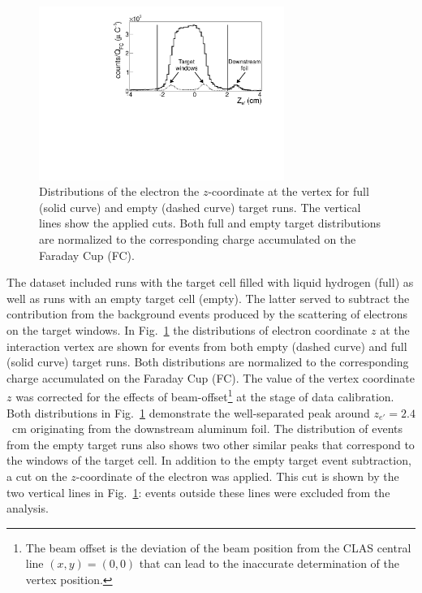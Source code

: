 \documentclass[prc,twocolumn,superscriptaddress,showpacs,amssymb,amsmath,amsfonts,aps,nofootinbib]{revtex4-1}
\begin{document}
\begin{figure}[htp]
\begin{center}
 \includegraphics[width=8cm,keepaspectratio,clip,trim={0 0 0 0}]{pictures/vertex/vertex_new.pdf}
\vspace{-0.1cm}
\caption{Distributions of the electron the $z$-coordinate at the vertex for full (solid curve) and empty (dashed curve) target runs. The vertical lines show the applied cuts. Both full and empty target distributions are normalized to the corresponding charge accumulated on the Faraday Cup (FC).}
\label{fig:zvertex}
\end{center}
\end{figure} 

The dataset included runs with the target cell filled with liquid hydrogen (full) as well as runs with an empty target cell (empty). The latter served to subtract the contribution from the background events produced  by the scattering of electrons on the target windows. 
In Fig.~\ref{fig:zvertex} the distributions of electron coordinate $z$ at the interaction vertex are shown for events from both empty (dashed curve) and full (solid curve) target runs. Both distributions are normalized to the corresponding charge accumulated on the Faraday Cup (FC). The value of the vertex coordinate $z$ was corrected for the effects of beam-offset\footnote[2]{The beam offset is the deviation of the beam position from the CLAS central line $(x,y)=(0,0)$ that can lead to the inaccurate determination of the vertex position.} at the stage of data calibration. Both distributions in Fig.~\ref{fig:zvertex} demonstrate the well-separated peak around $z_{e'} = 2.4$~cm originating from the downstream aluminum foil. The distribution of events from the empty target runs also shows two other similar peaks that correspond to the windows of the target cell. In addition to the empty target event subtraction, a cut on the $z$-coordinate of the electron was applied. This cut is shown by the two vertical lines in Fig.~\ref{fig:zvertex}: events outside these lines were excluded from the analysis. 
 
\end{document}
